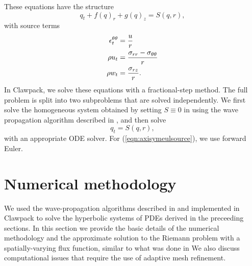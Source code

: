 \documentclass{article}
\begin{document}
These equations have the structure
\begin{equation}\label{2dsrc}
q_t + f(q)_r + g(q)_z = S(q,r),
\end{equation}
with source terms
\begin{align}
\epsilon^{\theta \theta}_t &= \frac{u}{r}  \notag\\
\rho u_t &= \frac{\sigma_{rr} - \sigma_{\theta \theta}}{r}\label{eqn:axisymeulsource}\\
\rho w_t &= \frac{\sigma_{rz}}{r}.\notag
\end{align} 
In Clawpack, we solve these equations with a fractional-step method.  The full problem is split into two subproblems that are solved independently.  
We first solve the homogeneous system obtained by setting $S\equiv 0$ in  
using the wave propagation algorithm described in , and then solve
\begin{equation}
q_t = S(q,r),
\end{equation}
with an appropriate ODE solver.  For (\ref{eqn:axisymeulsource}), we use forward Euler. 

\section{Numerical methodology}
\label{sec:numerics}
We used the wave-propagation algorithms described in \cite{rjl_book}
and implemented in Clawpack \cite{clawpack} to solve the hyperbolic systems
of PDEs derived in the preceeding sections.
In this section we provide the basic details of the
numerical methodology and the approximate solution to the Riemann problem
with a spatially-varying flux function, similar to what was done in
\cite{rjl_nonlinear}  We also discuss computational issues that require
the use of adaptive mesh refinement.
\end{document}
